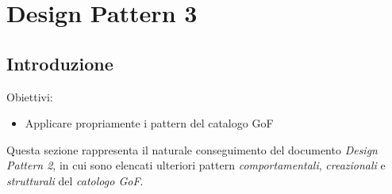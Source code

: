 \documentclass{article}
\begin{document}
\pagestyle{empty}
\section*{Design Pattern 3}
\large

\subsection*{Introduzione}
\large
Obiettivi:
\begin{itemize}
    \renewcommand{\labelitemi}{-}
    \itemsep0em
    \item Applicare propriamente i pattern del catalogo GoF 
\end{itemize}
Questa sezione rappresenta il naturale conseguimento del documento \textit{Design Pattern 2}, in cui sono elencati ulteriori pattern \textit{comportamentali}, \textit{creazionali} e \textit{strutturali} del \textit{catologo GoF}.
\end{document}
